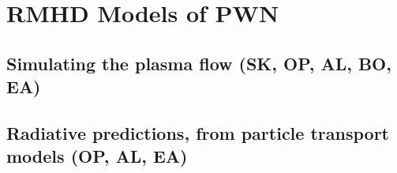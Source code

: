 \section{RMHD Models of PWN}
\label{sec:rmhd}
\subsection{Simulating the plasma flow         (SK, OP, AL, BO, EA)}
\subsection{Radiative predictions, from particle transport models      (OP, AL, EA)}